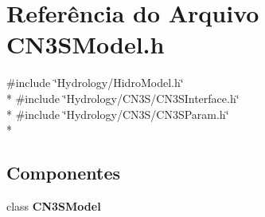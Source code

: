 \section{Referência do Arquivo C\+N3\+S\+Model.\+h}
\label{_c_n3_s_model_8h}
{\ttfamily \#include \char`\"{}Hydrology/\+Hidro\+Model.\+h\char`\"{}}\\*
{\ttfamily \#include \char`\"{}Hydrology/\+C\+N3\+S/\+C\+N3\+S\+Interface.\+h\char`\"{}}\\*
{\ttfamily \#include \char`\"{}Hydrology/\+C\+N3\+S/\+C\+N3\+S\+Param.\+h\char`\"{}}\\*
\subsection*{Componentes}
\begin{DoxyCompactItemize}
\item 
class {\bf C\+N3\+S\+Model}
\end{DoxyCompactItemize}
